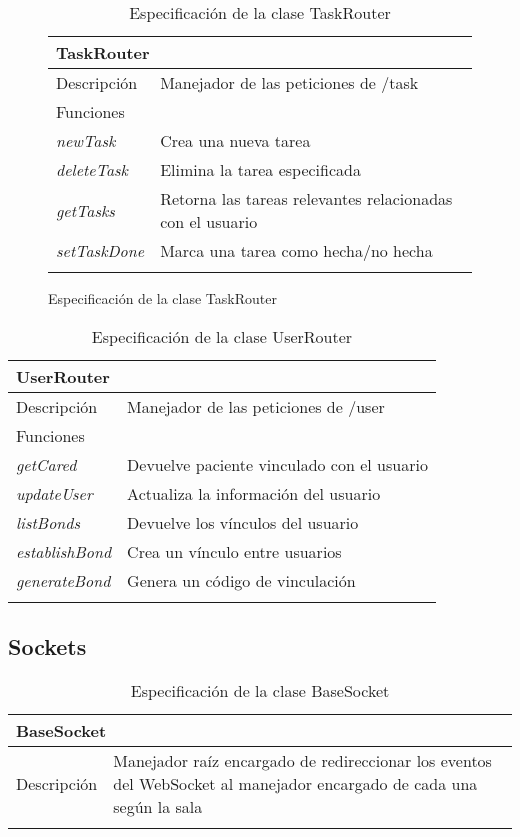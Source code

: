 \begin{figure}[H]
\begin{longtable}{|p{} p{}|}
    \hline
    \multicolumn{2}{|l|}{TaskRouter} \\ \hline \hline
    Descripción      & Manejador de las peticiones de /task \\ \hline
    \multicolumn{2}{|l|}{Funciones} \\
    \emph{newTask}  & Crea una nueva tarea  \\ 
    \emph{deleteTask}  & Elimina la tarea especificada  \\ 
    \emph{getTasks}  & Retorna las tareas relevantes relacionadas con el usuario  \\ 
    \emph{setTaskDone}  & Marca una tarea como hecha/no hecha  \\ \hline
    \caption{Especificación de la clase TaskRouter}
    \label{class:api:task_router}
\end{longtable}
\end{figure}

\vspace{-20pt}
\begin{longtable}{|p{} p{}|}
    \hline
    \multicolumn{2}{|l|}{UserRouter} \\ \hline \hline
    Descripción      & Manejador de las peticiones de /user \\ \hline
    \multicolumn{2}{|l|}{Funciones} \\
    \emph{getCared}  & Devuelve paciente vinculado con el usuario  \\
    \emph{updateUser}  & Actualiza la información del usuario  \\
    \emph{listBonds}  & Devuelve los vínculos del usuario  \\
    \emph{establishBond}  & Crea un vínculo entre usuarios  \\
    \emph{generateBond}  & Genera un código de vinculación  \\ \hline
    \caption{Especificación de la clase UserRouter}
    \label{class:api:user_router}
\end{longtable}

\vspace{-30pt}
\subsection{Sockets}

\begin{longtable}{|p{} p{}|}
    \hline
    \multicolumn{2}{|l|}{BaseSocket} \\ \hline \hline
    Descripción      & Manejador raíz encargado de redireccionar los eventos del WebSocket al manejador encargado de cada una según la sala \\ \hline
    \caption{Especificación de la clase BaseSocket}
    \label{class:api:base_socket}
\end{longtable}


